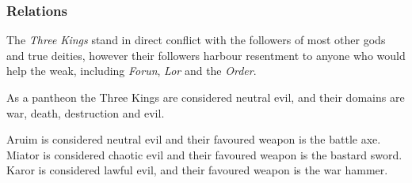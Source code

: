 \subsubsection*{Relations}

The \emph{Three Kings} stand in direct conflict with the followers of most
other gods and true deities, however their followers harbour resentment to
anyone who would help the weak, including \emph{Forun}, \emph{Lor} and the
\emph{Order}.

\begin{35e}
  As a pantheon the Three Kings are considered neutral evil, and their domains
  are war, death, destruction and evil.

  Aruim is considered neutral evil and their favoured weapon is the battle axe.
  Miator is considered chaotic evil and their favoured weapon is the bastard
  sword. Karor is considered lawful evil, and their favoured weapon is the
  war hammer.
\end{35e}
